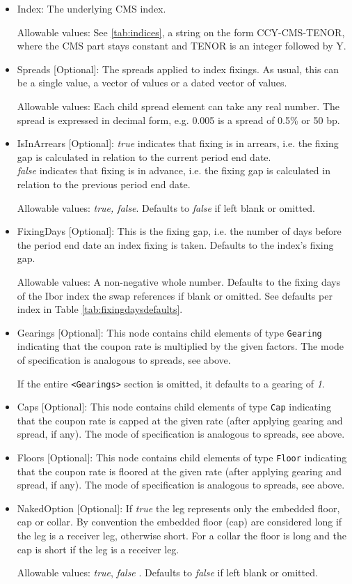 \begin{itemize}
\item Index: The underlying CMS index.

Allowable values:  See \ref{tab:indices}, a string on the form CCY-CMS-TENOR, where the CMS part stays constant and TENOR is an integer followed by Y.

\item Spreads [Optional]: The spreads applied to index fixings. As usual, this can be a single value, a vector of values or a dated vector of
  values.
  
  Allowable values: Each child spread element can take any real number. The spread is expressed in decimal form, e.g. 0.005 is
  a spread of 0.5\% or 50 bp. 
    
\item IsInArrears [Optional]:  \emph{true} indicates that  fixing is in arrears, 
  i.e. the fixing gap is calculated in relation to the current period
  end date.\\ \emph{false} indicates that  fixing is in advance,
  i.e. the fixing gap is calculated in relation to the previous period
  end date.
  
Allowable values:  \emph{true, false}. Defaults to \emph{false} if left blank or omitted.
  
\item FixingDays [Optional]: This is the fixing gap, i.e. the number of days
  before the period end date an index fixing is taken. Defaults to the index's fixing gap.
  
    Allowable values: A non-negative whole number.  Defaults to the fixing days of the Ibor index the swap references if blank or omitted. See defaults per index in Table \ref{tab:fixingdaysdefaults}.
  
\item Gearings [Optional]: This node contains child elements of type \lstinline!Gearing! indicating that the coupon rate is
  multiplied by the given factors. The mode of specification is analogous to spreads, see above.
  
  If the entire {\tt <Gearings>} section is omitted, it defaults to a gearing of \emph{1}.
  
\item Caps [Optional]: This node contains child elements of type \lstinline!Cap! indicating that the coupon rate is capped at the
  given rate (after applying gearing and spread, if any). The mode of specification is analogous to spreads, see above.
\item Floors [Optional]: This node contains child elements of type \lstinline!Floor! indicating that the coupon rate is floored at
  the given rate (after applying gearing and spread, if any). The mode of specification is analogous to spreads, see
  above.
\item NakedOption [Optional]: If \emph{true} the leg represents only the embedded floor, cap or collar.
  By convention the embedded floor (cap) are considered long if the leg is a receiver leg, otherwise short. For a
  collar the floor is long and the cap is short if the leg is a receiver leg.
  
Allowable values: \emph{true}, \emph{false} . Defaults to \emph{false} if left blank or omitted.


\end{itemize}
